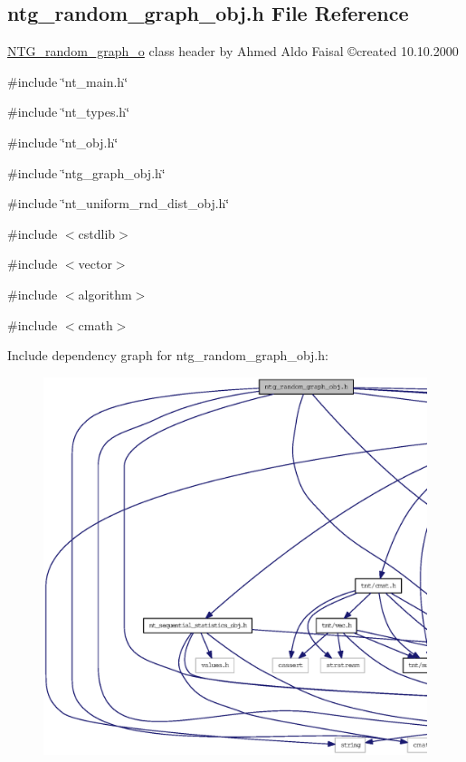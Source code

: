 \subsection{ntg\_\-random\_\-graph\_\-obj.h File Reference}
\label{ntg__random__graph__obj_8h}



\begin{DoxyItemize}
\item \hyperlink{class_n_t_g__random__graph__o}{NTG\_\-random\_\-graph\_\-o} class header by Ahmed Aldo Faisal \copyright created 10.10.2000 
\end{DoxyItemize} 


{\ttfamily \#include \char`\"{}nt\_\-main.h\char`\"{}}\par
{\ttfamily \#include \char`\"{}nt\_\-types.h\char`\"{}}\par
{\ttfamily \#include \char`\"{}nt\_\-obj.h\char`\"{}}\par
{\ttfamily \#include \char`\"{}ntg\_\-graph\_\-obj.h\char`\"{}}\par
{\ttfamily \#include \char`\"{}nt\_\-uniform\_\-rnd\_\-dist\_\-obj.h\char`\"{}}\par
{\ttfamily \#include $<$cstdlib$>$}\par
{\ttfamily \#include $<$vector$>$}\par
{\ttfamily \#include $<$algorithm$>$}\par
{\ttfamily \#include $<$cmath$>$}\par
Include dependency graph for ntg\_\-random\_\-graph\_\-obj.h:
\nopagebreak
\begin{figure}[H]
\begin{center}
\leavevmode
\includegraphics[width=400pt]{ntg__random__graph__obj_8h__incl}
\end{center}
\end{figure}
